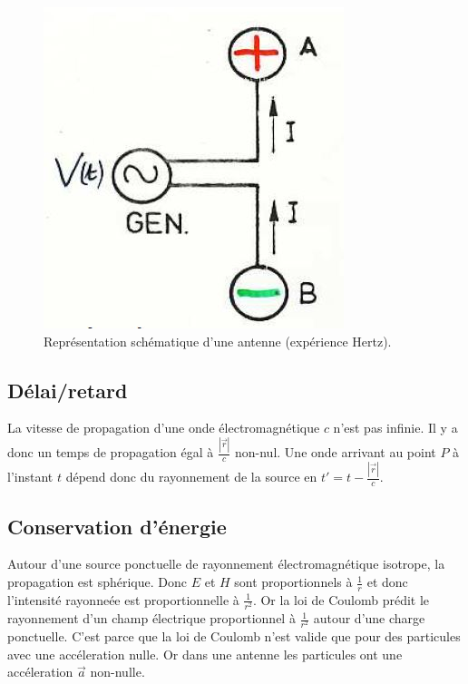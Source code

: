 \begin{figure}[ht]
	\centering
	\includegraphics[scale=0.8]{img/antenne.jpg}
	\caption{Représentation schématique d'une antenne (expérience Hertz).}
	\label{fig:antenne}
\end{figure}

%
%

\subsection{Délai/retard}
La vitesse de propagation d'une onde électromagnétique
$c$ n'est pas infinie. Il y a donc un temps de propagation
égal à $\frac{|\vec{r}|}{c}$ non-nul. Une onde arrivant
au point $P$ à l'instant $t$ dépend donc du rayonnement
de la source en $t' = t - \frac{|\vec{r}|}{c}$.

\subsection{Conservation d'énergie}
Autour d'une source ponctuelle de rayonnement électromagnétique
isotrope, la propagation est sphérique. Donc $E$ et $H$
sont proportionnels à $\frac{1}{r}$ et donc l'intensité rayonneée
est proportionnelle à $\frac{1}{r^2}$.
Or la loi de Coulomb prédit le rayonnement d'un
champ électrique proportionnel à $\frac{1}{r^2}$ autour
d'une charge ponctuelle. C'est parce que la loi
de Coulomb n'est valide que pour des particules
avec une accéleration nulle. Or dans une antenne les particules
ont une accéleration $\vec{a}$ non-nulle.

